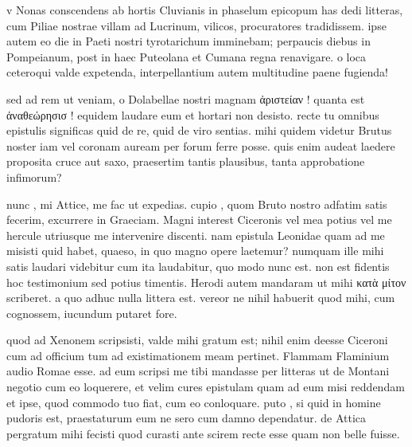 


 v Nonas conscendens ab hortis Cluvianis in phaselum epicopum has dedi litteras, cum Piliae nostrae villam ad Lucrinum, vilicos, procuratores tradidissem. ipse autem eo die in Paeti nostri tyrotarichum imminebam; perpaucis diebus in Pompeianum, post in haec Puteolana et Cumana regna renavigare. o loca ceteroqui valde expetenda, interpellantium autem multitudine paene fugienda!

 sed ad rem ut veniam, o Dolabellae nostri magnam ἀριστείαν ! quanta est ἀναθεώρησισ ! equidem laudare eum et hortari non desisto. recte tu omnibus epistulis significas quid de re, quid de viro sentias. mihi quidem videtur Brutus noster iam vel coronam auream per forum ferre posse. quis enim audeat laedere proposita cruce aut saxo, praesertim tantis plausibus, tanta approbatione infimorum?

 nunc , mi Attice, me fac ut expedias. cupio , quom Bruto nostro adfatim satis fecerim, excurrere in Graeciam. Magni interest Ciceronis vel mea potius vel me hercule utriusque me intervenire discenti. nam epistula Leonidae quam ad me misisti quid habet, quaeso, in quo magno opere laetemur? numquam ille mihi satis laudari videbitur cum ita laudabitur, quo modo nunc est. non est fidentis hoc testimonium sed potius timentis. Herodi autem mandaram ut mihi κατὰ μίτον scriberet. a quo adhuc nulla littera est. vereor ne nihil habuerit quod mihi, cum cognossem, iucundum putaret fore.

 quod ad Xenonem scripsisti, valde mihi gratum est; nihil enim deesse Ciceroni cum ad officium tum ad existimationem meam pertinet. Flammam Flaminium audio Romae esse. ad eum scripsi me tibi mandasse per litteras ut de Montani negotio cum eo loquerere, et velim cures epistulam quam ad eum misi reddendam et ipse, quod commodo tuo fiat, cum eo conloquare. puto , si quid in homine pudoris est, praestaturum eum ne sero cum damno dependatur. de Attica pergratum mihi fecisti quod curasti ante scirem recte esse quam non belle fuisse.
